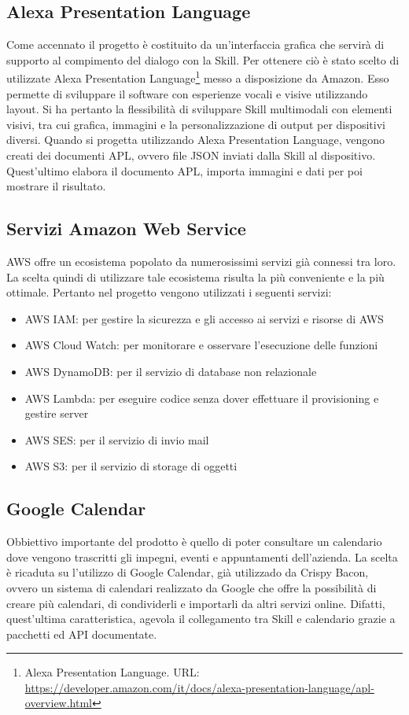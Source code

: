 \subsection{Alexa Presentation Language}
Come accennato il progetto è costituito da un'interfaccia grafica che servirà di supporto al compimento del dialogo con la Skill. Per ottenere ciò è stato scelto di utilizzate Alexa Presentation Language\footnote{Alexa Presentation Language. URL: \href{https://developer.amazon.com/it/docs/alexa-presentation-language/apl-overview.html}{https://developer.amazon.com/it/docs/alexa-presentation-language/apl-overview.html}} messo a disposizione da Amazon. Esso permette di sviluppare il software con esperienze vocali e visive utilizzando layout. Si ha pertanto la flessibilità di sviluppare Skill multimodali con elementi visivi, tra cui grafica, immagini e la personalizzazione di output per dispositivi diversi. Quando si progetta utilizzando Alexa Presentation Language, vengono creati dei documenti APL, ovvero file JSON inviati dalla Skill al dispositivo. Quest'ultimo elabora il documento APL, importa immagini e dati per poi mostrare il risultato.

\subsection{Servizi Amazon Web Service}
\label{serivizi_aws}
AWS offre un ecosistema popolato da numerosissimi servizi già connessi tra loro. La scelta quindi di utilizzare tale ecosistema risulta la più conveniente e la più ottimale. Pertanto nel progetto vengono utilizzati i seguenti servizi:
\begin{itemize}
    \item AWS IAM: per gestire la sicurezza e gli accesso ai servizi e risorse di AWS
    \item AWS Cloud Watch: per monitorare e osservare l'esecuzione delle funzioni
    \item AWS DynamoDB: per il servizio di database non relazionale 
    \item AWS Lambda: per eseguire codice senza dover effettuare il provisioning e gestire server
    \item AWS SES: per il servizio di invio mail 
    \item AWS S3: per il servizio di storage di oggetti 
\end{itemize}

\subsection{Google Calendar}
Obbiettivo importante del prodotto è quello di poter consultare un calendario dove vengono trascritti gli impegni, eventi e appuntamenti dell'azienda. La scelta è ricaduta su l'utilizzo di Google Calendar, già utilizzado da Crispy Bacon, ovvero un sistema di calendari realizzato da Google che offre la possibilità di creare più calendari, di condividerli e importarli da altri servizi online. Difatti, quest'ultima caratteristica, agevola il collegamento tra Skill e calendario grazie a pacchetti ed API documentate.

